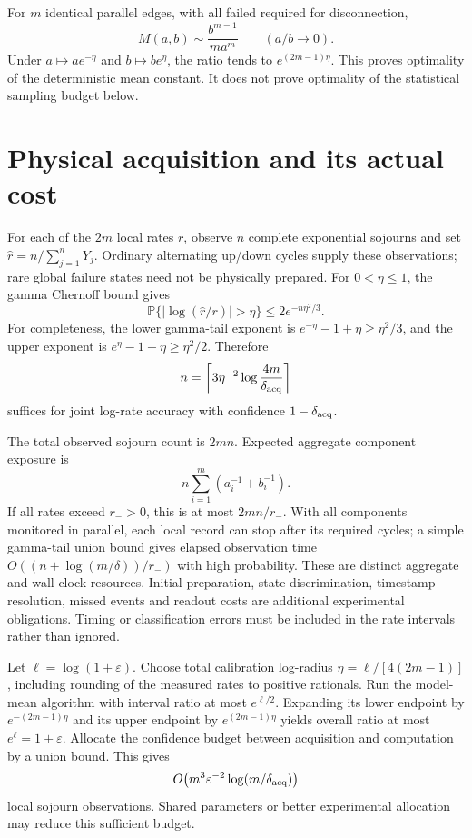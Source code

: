 \documentclass[11pt,a4paper]{article}
\newcommand{\Pp}{\mathbb P}
\begin{document}
For $m$ identical parallel edges, with all failed required for disconnection,
\[
 M(a,b)\sim\frac{b^{m-1}}{m a^m}\qquad(a/b\to0).
\]
Under $a\mapsto ae^{-\eta}$ and $b\mapsto be^{\eta}$, the ratio tends to $e^{(2m-1)\eta}$. This proves optimality of the deterministic mean constant. It does not prove optimality of the statistical sampling budget below.

\section{Physical acquisition and its actual cost}
For each of the $2m$ local rates $r$, observe $n$ complete exponential sojourns and set $\widehat r=n/\sum_{j=1}^nY_j$. Ordinary alternating up/down cycles supply these observations; rare global failure states need not be physically prepared. For $0<\eta\le1$, the gamma Chernoff bound gives
\[
 \Pp\{|\log(\widehat r/r)|>\eta\}\le2e^{-n\eta^2/3}.
\]
For completeness, the lower gamma-tail exponent is $e^{-\eta}-1+\eta\ge\eta^2/3$, and the upper exponent is $e^{\eta}-1-\eta\ge\eta^2/2$. Therefore
\begin{equation}
 n=\left\lceil3\eta^{-2}\log\frac{4m}{\delta_{\rm acq}}\right\rceil\label{eq:ncal}
\end{equation}
suffices for joint log-rate accuracy with confidence $1-\delta_{\rm acq}$.

The total observed sojourn count is $2mn$. Expected aggregate component exposure is
\begin{equation}
 n\sum_{i=1}^m\left(a_i^{-1}+b_i^{-1}\right).\label{eq:exposure}
\end{equation}
If all rates exceed $r_->0$, this is at most $2mn/r_-$. With all components monitored in parallel, each local record can stop after its required cycles; a simple gamma-tail union bound gives elapsed observation time $O((n+\log(m/\delta))/r_-)$ with high probability. These are distinct aggregate and wall-clock resources. Initial preparation, state discrimination, timestamp resolution, missed events and readout costs are additional experimental obligations. Timing or classification errors must be included in the rate intervals rather than ignored.

Let $\ell=\log(1+\varepsilon)$. Choose total calibration log-radius $\eta=\ell/[4(2m-1)]$, including rounding of the measured rates to positive rationals. Run the model-mean algorithm with interval ratio at most $e^{\ell/2}$. Expanding its lower endpoint by $e^{-(2m-1)\eta}$ and its upper endpoint by $e^{(2m-1)\eta}$ yields overall ratio at most $e^\ell=1+\varepsilon$. Allocate the confidence budget between acquisition and computation by a union bound. This gives
\[
 O\!\left(m^3\varepsilon^{-2}\log(m/\delta_{\rm acq})\right)
\]
local sojourn observations. Shared parameters or better experimental allocation may reduce this sufficient budget.
\end{document}
